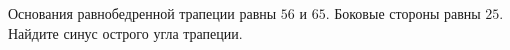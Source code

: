 \begin{ex}
	\begin{condition}
		Основания равнобедренной трапеции равны \(56\) и \( 65 \). Боковые стороны равны \( 25 \). Найдите синус острого угла трапеции.
	\end{condition}
\end{ex}
